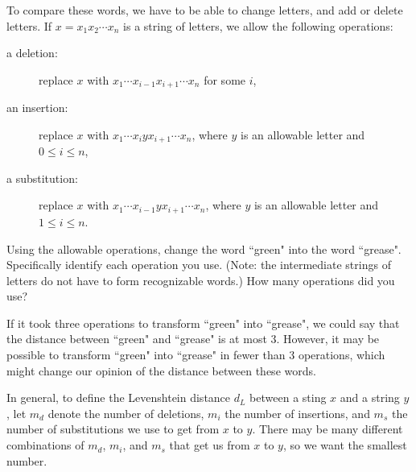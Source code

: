 To compare these words, we have to be able to change letters, and add or delete letters. If $x = x_1x_2 \cdots x_n$ is a string of letters, we allow the following operations:
\begin{description}
\item[a deletion:] replace $x$ with $x_1 \cdots x_{i-1}x_{i+1} \cdots x_n$ for some $i$, 
\item[an insertion:] replace $x$ with $x_1 \cdots x_{i}yx_{i+1} \cdots x_n$, where $y$ is an allowable letter and $0 \leq i \leq n$, 
\item[a substitution:] replace $x$ with $x_1 \cdots x_{i-1}yx_{i+1} \cdots x_n$, where $y$ is an allowable letter and $1 \leq i \leq n$.
\end{description}



\begin{activity} Using the allowable operations, change the word ``green" into the word ``grease". Specifically identify each operation you use. (Note: the intermediate strings of letters do not have to form recognizable words.) How many operations did you use?



\begin{comment}
So to change ``green" into ``grease", we could proceed as follows:
\begin{center}
\begin{tabular}{lcl} 
$x$	&:	&green \\
replace e	&:	&grean \\
replace n	&:	&greas \\
insert e	&:	&grease
\end{tabular}
\end{center}

\end{comment}

\end{activity}



If it took three operations to transform ``green" into ``grease", we could say that the distance between ``green" and ``grease" is at most 3. However, it may be possible to transform ``green" into ``grease" in fewer than 3 operations, which might change our opinion of the distance between these words. 

In general, to define the Levenshtein distance $d_L$ between a sting $x$ and a string $y$, let $m_d$ denote the number of deletions, $m_i$ the number of insertions, and $m_s$ the number of substitutions we use to get from $x$ to $y$. There may be many different combinations of $m_d$, $m_i$, and $m_s$ that get us from $x$ to $y$, so we want the smallest number. 

